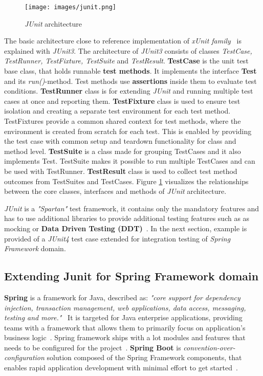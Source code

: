     \begin{figure}[ht]
      \begin{center}
        \texttt{[image: images/junit.png]}
        \caption{\textit{JUnit} architecture}
        \label{fig:junit}
      \end{center}
    \end{figure}

    The basic architecture close to reference implementation of \textit{xUnit family}~\cite{hamill2004unit} is explained with
    \textit{JUnit3}. The architecture of \textit{JUnit3} consists of classes \textit{TestCase, TestRunner, TestFixture, TestSuite} and \textit{TestResult}.
    \textbf{TestCase} is the unit test base class, that holds runnable \textbf{test methods}.
    It implements the interface \textbf{Test} and its \textit{run()}-method. Test methods use \textbf{assertions} inside them to evaluate test conditions.
    \textbf{TestRunner} class is for extending \textit{JUnit} and running multiple test cases at once and reporting
    them. \textbf{TestFixture} class is used to ensure test isolation and creating a separate test environment for each test method.
    TestFixtures provide a common shared context for test methods, where the environment is created from scratch for each test.
    This is enabled by providing the test case with common setup and teardown functionality for class and method level.
    \textbf{TestSuite} is a class made for grouping TestCases and it also implements Test. TestSuite makes it possible to run multiple TestCases and can
    be used with TestRunner. \textbf{TestResult} class is used to collect test method outcomes from TestSuites and TestCases.
    Figure \ref{fig:junit} visualizes the relationships between the core classes, interfaces and methods of	\textit{JUnit} architecture. ~\cite{hamill2004unit}

    \textit{JUnit} is a \textit{"Spartan"} test framework, it contains only the mandatory features and has to use additional libraries
    to provide additional testing features such as as mocking or \textbf{Data Driven Testing (DDT)}~\cite{kapelonis2016java}.
    In the next section, example is provided of a \textit{JUnit4} test case extended for integration testing of \textit{Spring Framework} domain.

    \subsection{Extending Junit for Spring Framework domain}
    \label{section:junit-extend}
    \textbf{Spring} is a framework for Java, described as:
    \textit{"core support for dependency injection, transaction management, web applications, data access, messaging, testing and more."}~\cite{spring}
    It is targeted for Java enterprise applications, providing teams with a framework that allows them to primarily focus on
    application's business logic~\cite{spring}. Spring framework ships with a lot modules and features that needs to be
    configured for the project~\cite{wiki:spring}. \textbf{Spring Boot} is \textit{convention-over-configuration} solution
    composed of the Spring Framework components, that enables rapid application development with minimal effort to get started~\cite{wiki:spring}.

